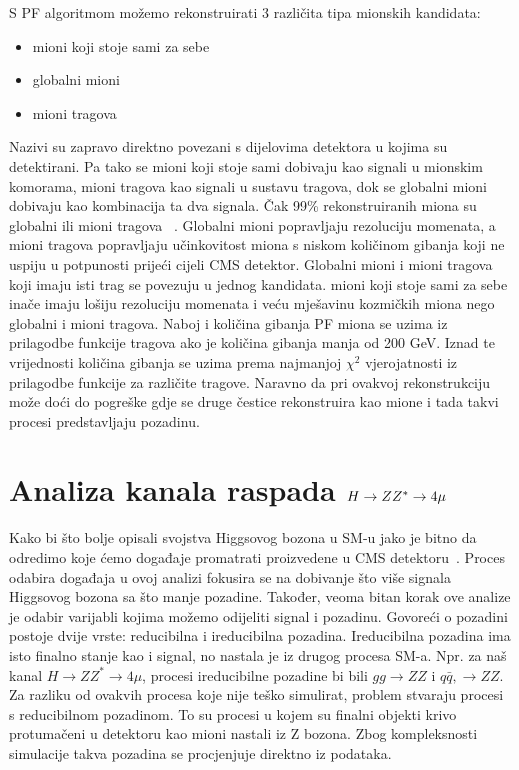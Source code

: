 \documentclass[12pt,a4paper,oneside]{article}
\begin{document}
\begin{linenumbers}
		S PF algoritmom možemo rekonstruirati 3 različita tipa mionskih kandidata:
		\begin{itemize}
			\item mioni koji stoje sami za sebe
			\item globalni mioni
			\item mioni tragova 
		\end{itemize}
		Nazivi su zapravo direktno povezani s dijelovima detektora u kojima su detektirani. Pa tako se mioni koji stoje sami dobivaju kao signali u mionskim komorama, mioni tragova kao signali u sustavu tragova, dok se globalni mioni dobivaju kao kombinacija ta dva signala. 
		Čak 99\% rekonstruiranih miona su globalni ili mioni tragova ~\cite{doktorat}. Globalni mioni popravljaju rezoluciju momenata, a mioni tragova popravljaju učinkovitost miona s niskom količinom gibanja koji ne uspiju u potpunosti prijeći cijeli CMS detektor. Globalni mioni i mioni tragova koji imaju isti trag se povezuju u jednog kandidata. mioni koji stoje sami za sebe inače imaju lošiju rezoluciju momenata i veću mješavinu kozmičkih miona nego globalni i mioni tragova.
		Naboj i količina gibanja PF miona se uzima iz prilagodbe funkcije tragova ako je količina gibanja manja od 200 GeV. Iznad te vrijednosti količina gibanja se uzima prema najmanjoj $\chi^{2}$ vjerojatnosti iz prilagodbe funkcije za različite tragove. Naravno da pri ovakvoj rekonstrukciju može doći do pogreške gdje se druge čestice rekonstruira kao mione i tada takvi procesi predstavljaju pozadinu.
		
		\newpage
		\section{Analiza kanala raspada \begin{math}
		\boldmath	{H \rightarrow ZZ^* \rightarrow 4\mu }\end{math} }
		Kako bi što bolje opisali svojstva Higgsovog bozona u SM-u jako je bitno da odredimo koje ćemo događaje promatrati proizvedene u CMS detektoru~\cite{doktorat}.
		Proces odabira događaja u ovoj analizi fokusira se na dobivanje što više signala Higgsovog bozona sa što manje pozadine. Također, veoma bitan korak ove analize je odabir varijabli kojima možemo odijeliti signal i pozadinu. Govoreći o pozadini postoje dvije vrste: reducibilna i ireducibilna pozadina. 
		Ireducibilna pozadina ima isto finalno stanje kao i signal, no nastala je iz drugog procesa SM-a. Npr. za naš kanal \begin{math}
		H \rightarrow ZZ^* \rightarrow 4\mu \end{math}, procesi ireducibilne pozadine bi bili \begin{math}
		gg \rightarrow ZZ
		\end{math} i \begin{math}
		q\bar{q}, \rightarrow ZZ
		\end{math}. Za razliku od ovakvih procesa koje nije teško simulirat, problem stvaraju procesi s reducibilnom pozadinom. To su procesi u kojem su finalni objekti krivo protumačeni u detektoru kao mioni nastali iz Z bozona. Zbog kompleksnosti simulacije takva pozadina se procjenjuje direktno iz podataka.
		

\end{linenumbers}
\end{document}
